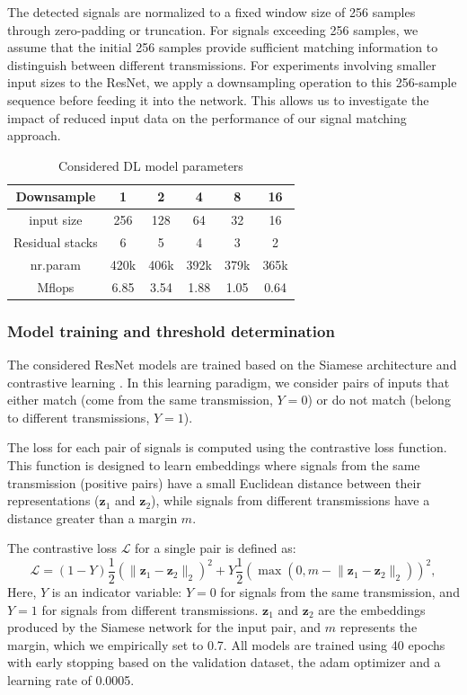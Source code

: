 \documentclass[sigconf, 10pt, nonacm, anonymous]{acmart}  %
\begin{document}
The detected signals are normalized to a fixed window size of 256 samples through zero-padding or truncation. For signals exceeding 256 samples, we assume that the initial 256 samples provide sufficient matching information to distinguish between different transmissions. For experiments involving smaller input sizes to the ResNet, we apply a downsampling operation to this 256-sample sequence before feeding it into the network. This allows us to investigate the impact of reduced input data on the performance of our signal matching approach.
\begin{table}[]
    \centering
    \caption{Considered DL model parameters}
    \begin{tabular}{c|c|c|c|c|c}
         Downsample & 1 &2&4&8&16\\\hline
         input size & 256&128&64&32&16\\
         Residual stacks & 6&5&4&3&2\\
         nr.param &420k&406k&392k&379k&365k\\
         Mflops  &6.85&3.54&1.88&1.05&0.64\\
    \end{tabular}
    
    \label{tab:model_overview}
\end{table}



\subsubsection{Model training and threshold determination}
The considered ResNet models are trained based on the Siamese architecture and contrastive learning \cite{chopra2005}. In this learning paradigm, we consider pairs of inputs that either match (come from the same transmission, $Y=0$) or do not match (belong to different transmissions, $Y=1$).

The loss for each pair of signals is computed using the contrastive loss function. This function is designed to learn embeddings where signals from the same transmission (positive pairs) have a small Euclidean distance between their representations ($\mathbf{z}_1$ and $\mathbf{z}_2$), while signals from different transmissions have a distance greater than a margin $m$.

The contrastive loss $\mathcal{L}$ for a single pair is defined as:
\[
\mathcal{L} = (1-Y)\frac{1}{2}(\lVert \mathbf{z}_1 - \mathbf{z}_2 \rVert_2)^2 + Y\frac{1}{2}(\max(0, m - \lVert \mathbf{z}_1 - \mathbf{z}_2 \rVert_2))^2,
\]
Here, $Y$ is an indicator variable: $Y=0$ for signals from the same transmission, and $Y=1$ for signals from different transmissions. $\mathbf{z}_1$ and $\mathbf{z}_2$ are the embeddings produced by the Siamese network for the input pair, and $m$ represents the margin, which we empirically set to 0.7.
All models are trained using 40 epochs with early stopping based on the validation dataset, the adam optimizer and a learning rate of 0.0005.  
\end{document}
